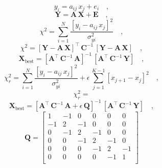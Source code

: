 \documentclass[12pt,twoside]{article}
\newcommand{\mmatrix}[1]{\boldsymbol{#1}}
\newcommand{\inverse}[1]{{#1}^{-1}}
\newcommand{\transpose}[1]{{#1}^{\scriptscriptstyle \top}}
\newcommand{\mA}{\mmatrix{A}}
\newcommand{\mAT}{\transpose{\mA}}
\newcommand{\mC}{\mmatrix{C}}
\newcommand{\mCinv}{\inverse{\mC}}
\newcommand{\mE}{\mmatrix{E}}
\newcommand{\mQ}{\mmatrix{Q}}
\newcommand{\mX}{\mmatrix{X}}
\newcommand{\mY}{\mmatrix{Y}}
\newcommand{\best}{\mathrm{best}}
\begin{document}
\begin{equation}
y_i = a_{ij}\,x_j + e_i
  \quad ,
\end{equation}
\begin{equation}
\mY = \mA\,\mX + \mE
  \quad ,
\end{equation}
\begin{equation}
\chi^2 = \sum_{i=1}^N
  \frac{\left[y_i - a_{ij}\,x_j\right]^2}{\sigma_{yi}^2}
  \quad ,
\end{equation}
\begin{equation}
\chi^2 = \transpose{\left[\mY-\mA\,\mX\right]}
  \,\mCinv\,\left[\mY-\mA\,\mX\right]
  \quad ,
\end{equation}
\begin{equation}
\mX_\best = \inverse{\left[\mAT\,\mCinv\,\mA\right]}
  \,\left[\mAT\,\mCinv\,\mY\right]
  \quad ,
\end{equation}
\begin{equation}
\chi_r^2 = \sum_{i=1}^N
  \frac{\left[y_i - a_{ij}\,x_j\right]^2}{\sigma_{yi}^2}
  + \epsilon\,\sum_{j=1}^{K-1}\left[x_{j+1}-x_j\right]^2
  \quad ,
\end{equation}
\begin{equation}
\chi_r^2 = 
\end{equation}
\begin{equation}
\mX_\best = \inverse{\left[\mAT\,\mCinv\,\mA + \epsilon\,\mQ\right]}
  \,\left[\mAT\,\mCinv\,\mY\right]
  \quad ,
\end{equation}
\begin{equation}
\mQ = \left[\begin{array}{cccccc}
    1 &-1 & 0 & 0 & 0 & 0 \\
   -1 & 2 &-1 & 0 & 0 & 0 \\
    0 &-1 & 2 &-1 & 0 & 0 \\
    0 & 0 &-1 & 2 &-1 & 0 \\
    0 & 0 & 0 &-1 & 2 &-1 \\
    0 & 0 & 0 & 0 &-1 & 1 \\
  \end{array}\right]
\end{equation}
\end{document}
